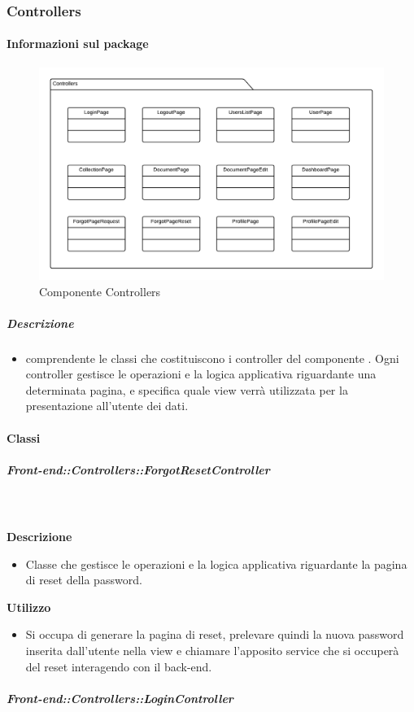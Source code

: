   \subsubsection{Controllers}
  \paragraph{Informazioni sul package}
    \begin{figure}[H] 
      \begin{center} 
        \includegraphics[width=\textwidth]{packages/Front-end::Controllers.png}  
        \caption{Componente Controllers}
      \end{center}  
    \end{figure} 
  \subparagraph{Descrizione} 
    \begin{itemize}
    \item[]  comprendente le classi che costituiscono i controller del componente . Ogni controller gestisce le operazioni e la logica applicativa riguardante una determinata pagina, e specifica quale view verrà utilizzata per la presentazione all'utente dei dati.
    \end{itemize} 
    \paragraph{Classi}
      \subparagraph{Front-end::Controllers::ForgotResetController}
        
        \textbf{\\ \\ Descrizione} 
          \begin{itemize}
            \item[] Classe che gestisce le operazioni e la logica applicativa riguardante la pagina di reset della password.
          \end{itemize}      
        \textbf{Utilizzo}  
          \begin{itemize}
            \item[] Si occupa di generare la pagina di reset, prelevare quindi la nuova password inserita dall'utente nella view e chiamare l'apposito service che si occuperà del reset interagendo con il back-end.
          \end{itemize}
      \subparagraph{Front-end::Controllers::LoginController}
        
